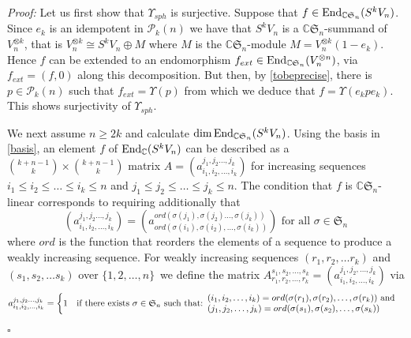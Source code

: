 \documentclass[10pt,hidelinks]{article}
\newcommand{\Ord}{{{ord}}}
\newcommand{\ParAlg}{{\mathcal P }_{k}}
\newcommand{\CC}{ \mathbb C }
\newcommand{\End}{{\rm End}}
\newcommand{\Si}{\mathfrak{S}}
\newenvironment{dem}{\noindent \textit{Proof:} }{\quad \hfill $\square$}
\numberwithin{equation}{section}
\begin{document}
  \begin{dem}
  Let us first show that $ \Upsilon_{sph} $ is surjective. Suppose that $ f \in \End_{ \CC \Si_n}( S^k V_n ) $.
Since $ e_k $ is an idempotent in $ \ParAlg(n) $ we have that $ S^k V_n $ is a $ \CC \Si_n $-summand of
$ V_n^{ \otimes k } $, that is $ V_n^{ \otimes k } \cong  S^k V_n \oplus M $ where $ M $ is 
the $ \CC \Si_n $-module $ M = V_n^{ \otimes k }(1-e_k) $. Hence $ f$ can be extended 
to an endomorphism $ f_{ext} \in  \End_{ \CC \Si_n}(  V_n^{ \otimes n} ) $, via $ f_{ext} = (f, 0 ) $ along
this decomposition.
But then, by \eqref{tobeprecise}, there is $ p \in \ParAlg(n) $ such that
$ f_{ext} = \Upsilon(p) $ from which we deduce that $ f = \Upsilon(e_k p e_k) $.
This shows 
surjectivity of $ \Upsilon_{sph}$. 


\medskip
We next assume $ n \ge 2k $ and calculate $  \dim\End_{ \CC \Si_n}( S^k V_n ) $.
Using the basis in \eqref{basis}, an 
element $ f$ of $   \End_{ \CC} ( S^k V_n ) $ can be described as a
$ \binom{k+n-1}{k} \times \binom{k+n-1}{k} $ matrix
  $ A = \left(a_{i_1, i_2, \ldots, i_k }^{j_1, j_2 \ldots, j_k } \right)  $ for increasing sequences 
$ i_1 \le  i_2 \le \ldots \le i_k \le n $ and $ j_1 \le  j_2 \le \ldots \le j_k \le n$. 
The condition that $ f $ is $ \CC \Si_n $-linear corresponds to requiring additionally that 
\begin{equation}\label{condition}
\left(a_{i_1, i_2, \ldots, i_k }^{j_1, j_2 \ldots, j_k }\right)
  = \left(a_{\Ord(\sigma(i_1), \sigma(i_2), \ldots, \sigma(i_k)) }^{\Ord(\sigma(j_1), \sigma(j_2) \ldots, \sigma(j_k ))}\right)
\mbox{   for all  }
 \sigma \in \Si_n
\end{equation}
where $ \Ord$ is the function that reorders the elements of a sequence to produce a weakly increasing sequence. 
For weakly increasing sequences $ (r_1, r_2, \ldots r_k) $ and $ (s_1, s_2, \ldots s_k) $ over $ \{1, 2, \ldots, n \} $\
we define the matrix
$
A_{r_1 , r_2 , \ldots,  r_k}^{  s_1 , s_2 , \ldots,  s_k} =
\left(a_{i_1, i_2, \ldots, i_k }^{j_1, j_2, \ldots, j_k }\right)
$ via
\begin{equation}
  a_{i_1, i_2, \ldots, i_k }^{j_1, j_2 \ldots, j_k } =
  \begin{dcases}
    1 & \mbox{if there exists }  \sigma \in \Si_n \mbox{ such that:}\begin{array}{l} (i_1, i_2, \ldots, i_k)=  \Ord(\sigma(r_1), \sigma(r_2), \ldots, \sigma(r_k)) \mbox{ and } 
\\  (j_1, j_2, \ldots, j_k)=  \Ord(\sigma(s_1), \sigma(s_2), \ldots, \sigma(s_k))

\end{array}
\end{dcases}
\end{equation}
\end{dem}
\end{document}
